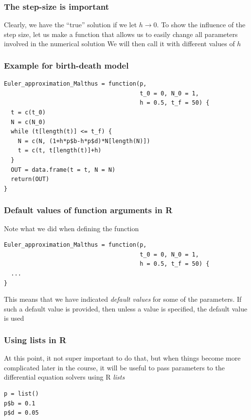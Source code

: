 \documentclass[aspectratio=169]{beamer}
\begin{document}


\begin{frame}\frametitle{The step-size is important}
Clearly, we have the ``true'' solution if we let $h\to 0$. To show the influence of the step size, let us make a function that allows us to easily change all parameters involved in the numerical solution
\vfill
We will then call it with different values of $h$
\end{frame}

\begin{frame}[fragile]\frametitle{Example for birth-death model}
\begin{lstlisting}
Euler_approximation_Malthus = function(p, 
                                       t_0 = 0, N_0 = 1, 
                                       h = 0.5, t_f = 50) {
  t = c(t_0)
  N = c(N_0)
  while (t[length(t)] <= t_f) {
    N = c(N, (1+h*p$b-h*p$d)*N[length(N)])
    t = c(t, t[length(t)]+h)
  }
  OUT = data.frame(t = t, N = N)
  return(OUT)
}
\end{lstlisting}
\end{frame}

\begin{frame}[fragile]\frametitle{Default values of function arguments in R}
Note what we did when defining the function
\vfill
\begin{lstlisting}
Euler_approximation_Malthus = function(p, 
                                       t_0 = 0, N_0 = 1, 
                                       h = 0.5, t_f = 50) {
  ...
}
\end{lstlisting}
\vfill
This means that we have indicated \emph{default values} for some of the parameters. If such a default value is provided, then unless a value is specified, the default value is used
\end{frame}


\begin{frame}[fragile]\frametitle{Using lists in R}
At this point, it not super important to do that, but when things become more complicated later in the course, it will be useful to pass parameters to the differential equation solvers using R \emph{lists}
\vfill
\begin{lstlisting}
p = list()
p$b = 0.1
p$d = 0.05
\end{lstlisting}
\end{frame}
\end{document}
